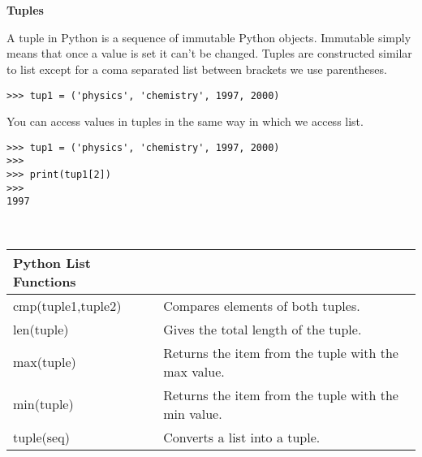 \documentclass[letterpaper,11pt]{article}
\begin{document}
\\ \\
\textbf{Tuples}
\par{A tuple in Python is a sequence of immutable Python objects. Immutable
simply means that once a value is set it can't be changed. Tuples are
constructed similar to list except for a coma separated list between brackets we
use parentheses.}
\\
\begin{minipage}{.5\textwidth}
    \begin{tcolorbox}
        \begin{footnotesize}
            \begin{verbatim}
>>> tup1 = ('physics', 'chemistry', 1997, 2000)
            \end{verbatim}
        \end{footnotesize}
    \end{tcolorbox}
\end{minipage}
\par{You can access values in tuples in the same way in which we access list.}
\\
\begin{minipage}{.5\textwidth}
    \begin{tcolorbox}
        \begin{footnotesize}
            \begin{verbatim}
>>> tup1 = ('physics', 'chemistry', 1997, 2000)
>>>
>>> print(tup1[2])
>>>
1997
            \end{verbatim}
        \end{footnotesize}
    \end{tcolorbox}
\end{minipage}
\\
\begin{tabular}[t]{l l}
    \textbf{Python List Functions}  \\
    \hline
    cmp(tuple1,tuple2) & Compares elements of both tuples.                   \\
    len(tuple)         & Gives the total length of the tuple.                \\
    max(tuple)         & Returns the item from the tuple with the max value. \\
    min(tuple)         & Returns the item from the tuple with the min value. \\
    tuple(seq)         & Converts a list into a tuple.                       \\
\end{tabular}
\end{document}
